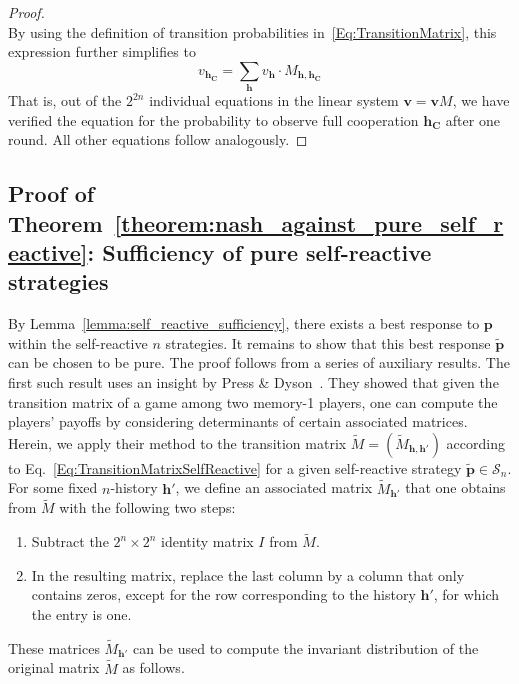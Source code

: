 \documentclass[11pt]{article}
\theoremstyle{plainCl1}
\theoremstyle{plainCl2}
\begin{document}
\begin{proof}
\begin{equation}
\end{equation}
By using the definition of transition probabilities in~\eqref{Eq:TransitionMatrix}, this expression further simplifies to
\begin{equation} 
v_\mathbf{h_C} = \sum_{\mathbf{h}} v_{\mathbf{h}} \cdot M_{\mathbf{h},\mathbf{h_C}}
\end{equation}
That is, out of the $2^{2n}$ individual equations in the linear system $\mathbf{v}\!=\!\mathbf{v} M$, we have verified the equation for the probability to observe full cooperation $\mathbf{h_C}$ after one round. All other equations follow analogously.
\end{proof}






\subsection{Proof of Theorem~\ref{theorem:nash_against_pure_self_reactive}: Sufficiency of pure self-reactive strategies}

By Lemma~\ref{lemma:self_reactive_sufficiency}, there exists a best response to $\mathbf{p}$ within the self-reactive $n$ strategies. 
It remains to show that this best response $\mathbf{\tilde p}$ can be chosen to be pure. 
The proof follows from a series of auxiliary results. 
The first such result uses an insight by Press \& Dyson~\citep{press:PNAS:2012}. 
They showed that given the transition matrix of a game among two memory-1 players, one can compute the players' payoffs by considering determinants of certain associated matrices. 
Herein, we apply their method to the transition matrix $\tilde M\!=\!(\tilde M_{\mathbf{h},\mathbf{h'}})$ according to Eq.~\eqref{Eq:TransitionMatrixSelfReactive} for a given self-reactive strategy $\mathbf{\tilde p}\!\in\!\mathcal{S}_n$. 
For some fixed $n$-history $\mathbf{h'}$, we define an associated matrix $\tilde M_\mathbf{h'}$ that one obtains from  $\tilde M$ with the following two steps:
\begin{enumerate}
\item Subtract the $2^n\!\times\!2^n$ identity matrix $I$ from $\tilde M$. 
\item In the resulting matrix, replace the last column by a column that only contains zeros, except for the row corresponding to the history $\mathbf{h'}$, for which the entry is one. 
\end{enumerate}
These matrices $\tilde M_\mathbf{h'}$ can be used to compute the invariant distribution of the original matrix $\tilde M$ as follows.\\
\end{document}
